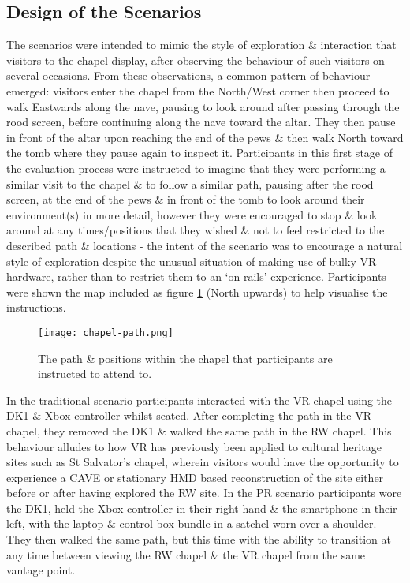 
\subsection{Design of the Scenarios}

The scenarios were intended to mimic the style of exploration \& interaction that visitors to the chapel display, after observing the behaviour of such visitors on several occasions. From these observations, a common pattern of behaviour emerged: visitors enter the chapel from the North/West corner then proceed to walk Eastwards along the nave, pausing to look around after passing through the rood screen, before continuing along the nave toward the altar. They then pause in front of the altar upon reaching the end of the pews \& then walk North toward the tomb where they pause again to inspect it. Participants in this first stage of the evaluation process were instructed to imagine that they were performing a similar visit to the chapel \& to follow a similar path, pausing after the rood screen, at the end of the pews \& in front of the tomb to look around their environment(s) in more detail, however they were encouraged to stop \& look around at any times/positions that they wished \& not to feel restricted to the described path \& locations - the intent of the scenario was to encourage a natural style of exploration despite the unusual situation of making use of bulky VR hardware, rather than to restrict them to an `on rails' experience. Participants were shown the map included as figure \ref{chapel-path} (North upwards) to help visualise the instructions.

\begin{figure}[h]
	\begin{center}
		\texttt{[image: chapel-path.png]}
		\caption{The path \& positions within the chapel that participants are instructed to attend to.}
		\label{chapel-path}
	\end{center}
\end{figure}

In the traditional scenario participants interacted with the VR chapel using the DK1 \& Xbox controller whilst seated. After completing the path in the VR chapel, they removed the DK1 \& walked the same path in the RW chapel. This behaviour alludes to how VR has previously been applied to cultural heritage sites such as St Salvator's chapel, wherein visitors would have the opportunity to experience a CAVE or stationary HMD based reconstruction of the site either before or after having explored the RW site. In the PR scenario participants wore the DK1, held the Xbox controller in their right hand \& the smartphone in their left, with the laptop \& control box bundle in a satchel worn over a shoulder. They then walked the same path, but this time with the ability to transition at any time between viewing the RW chapel \& the VR chapel from the same vantage point.


